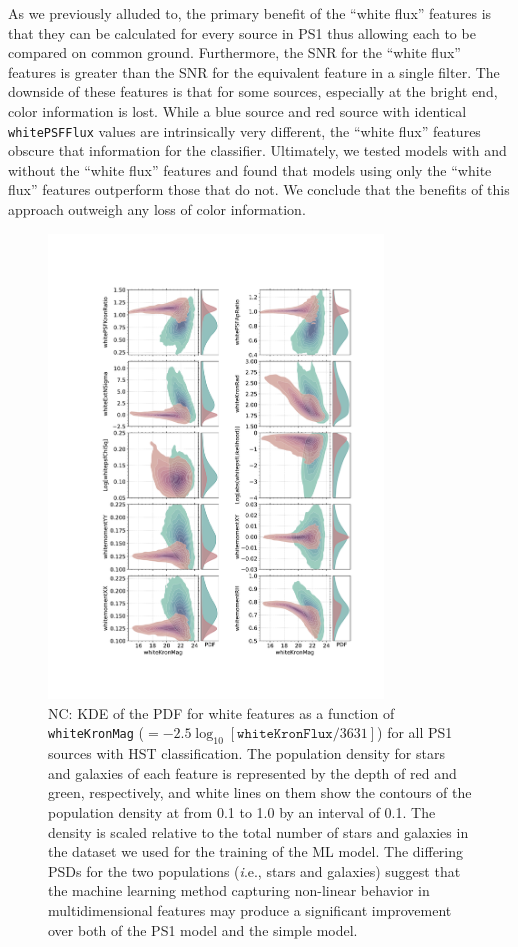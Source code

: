 \documentclass[twocolumn]{aastex62}
\newcommand{\NC}[1]{{\color{gray} NC: {#1}}}
\begin{document}
As we previously alluded to, the primary benefit of the ``white flux'' features is that they can be calculated for every source in PS1 thus allowing each to be compared on common ground. Furthermore, the SNR for the ``white flux'' features is greater than the SNR for the equivalent feature in a single filter. The downside of these features is that for some sources, especially at the bright end, color information is lost. While a blue source and red source with identical \texttt{whitePSFFlux} values are intrinsically very different, the ``white flux'' features obscure that information for the classifier. Ultimately, we tested models with and without the ``white flux'' features and found that models using only the ``white flux'' features outperform those that do not. We conclude that the benefits of this approach outweigh any loss of color information. 

\begin{figure}[t]
 \centering
  \includegraphics[width=3.5in, bb = 139 113 862 1163]{./Figures/whiteFeatures.pdf}
  \caption{
  \NC{KDE of the PDF for white features as a function of \texttt{whiteKronMag}
  ($=-2.5\log_{10}[\mathtt{whiteKronFlux}/3631]$) 
  for all PS1 sources with HST classification. 
  The population density for stars and galaxies of each feature is represented by the depth of red and green, respectively, 
  and white lines on them show the contours of the population density at from 0.1 to 1.0 by an interval of 0.1.
  The density is scaled relative to the total number of stars and galaxies in the dataset we used for the training of the ML model. 
  The differing PSDs for the two populations ({\textit i.e.,} stars and galaxies) suggest that 
  the machine learning method capturing non-linear behavior in multidimensional features 
  may produce a significant improvement over both of the PS1 model and the simple model. }
  }
  \label{fig:features}
\end{figure}
\end{document}
